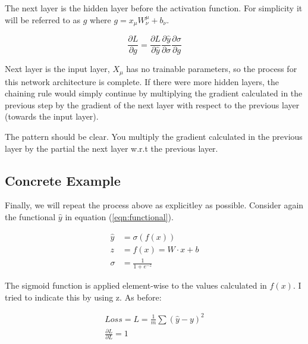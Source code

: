 \noindent The next layer is the hidden layer before the activation function. For simplicity it will be referred to as $ g $ where $ g = x_\mu W_\nu ^\mu + b_\nu $.  

\begin{equation}
    \frac{\partial L}{\partial g} = \frac{\partial L}{\partial \hat{y}} \frac{\partial \hat{y}}{\partial \sigma} \frac{\partial \sigma}{\partial g}
\end{equation}


\noindent Next layer is the input layer, $ X_\mu $ has no trainable parameters, so the process for this network architecture is complete. If there were more hidden layers, the chaining rule would simply continue by multiplying the gradient calculated in the previous step by the gradient of the next layer with respect to the previous layer (towards the input layer).



\noindent The pattern should be clear. You multiply the gradient calculated in the previous layer by the partial the next layer w.r.t the previous layer.

\subsection{Concrete Example}

Finally, we will repeat the process above as explicitley as possible. Consider again the functional $ \hat{y} $ in equation (\ref{eqn:functional}). 

\begin{align}
\hat{y} &= \sigma \left( f(x) \right) \\
z &= f(x) = W \cdot x + b \\
\sigma &= \frac{1}{1+e^{-z}}
\end{align}

The sigmoid function is applied element-wise to the values calculated in $f(x)$. I tried to indicate this by using z. As before:

\begin{align}
Loss = L = \frac{1}{m}\sum(\hat{y} - y)^2 \\
\frac{\partial L}{\partial L} = 1
\end{align}

